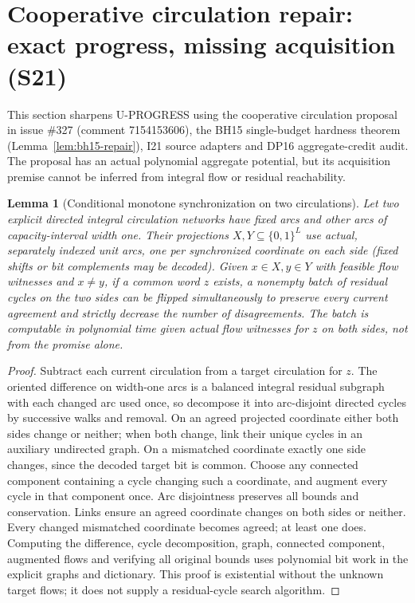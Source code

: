 \documentclass[11pt]{article}
\newtheorem{lemma}[theorem]{Lemma}
\begin{document}
\section{Cooperative circulation repair: exact progress, missing acquisition (S21)}\label{sec:s21}
This section sharpens U-PROGRESS using the cooperative circulation proposal in issue \#327 (comment 7154153606), the BH15 single-budget hardness theorem (Lemma~\ref{lem:bh15-repair}), I21 source adapters and DP16 aggregate-credit audit. The proposal has an actual polynomial aggregate potential, but its acquisition premise cannot be inferred from integral flow or residual reachability.

\begin{lemma}[Conditional monotone synchronization on two circulations]\label{lem:s21-cycle}
Let two explicit directed integral circulation networks have fixed arcs and other arcs of capacity-interval width one. Their projections $X,Y\subseteq\{0,1\}^L$ use actual, separately indexed unit arcs, one per synchronized coordinate on each side (fixed shifts or bit complements may be decoded). Given $x\in X,y\in Y$ with feasible flow witnesses and $x\ne y$, if a common word $z$ exists, a nonempty batch of residual cycles on the two sides can be flipped simultaneously to preserve every current agreement and strictly decrease the number of disagreements. The batch is computable in polynomial time given actual flow witnesses for $z$ on both sides, not from the promise alone.
\end{lemma}
\begin{proof}
Subtract each current circulation from a target circulation for $z$. The oriented difference on width-one arcs is a balanced integral residual subgraph with each changed arc used once, so decompose it into arc-disjoint directed cycles by successive walks and removal. On an agreed projected coordinate either both sides change or neither; when both change, link their unique cycles in an auxiliary undirected graph. On a mismatched coordinate exactly one side changes, since the decoded target bit is common. Choose any connected component containing a cycle changing such a coordinate, and augment every cycle in that component once. Arc disjointness preserves all bounds and conservation. Links ensure an agreed coordinate changes on both sides or neither. Every changed mismatched coordinate becomes agreed; at least one does. Computing the difference, cycle decomposition, graph, connected component, augmented flows and verifying all original bounds uses polynomial bit work in the explicit graphs and dictionary. This proof is existential without the unknown target flows; it does not supply a residual-cycle search algorithm.
\end{proof}
\end{document}
